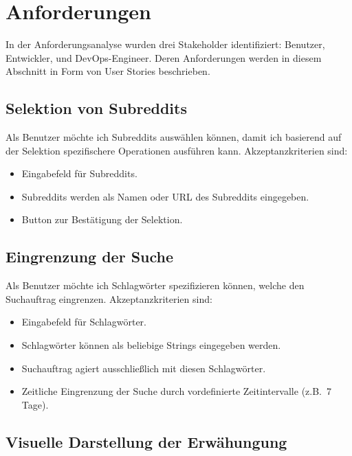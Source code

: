 \documentclass[a4paper, 10pt, conference]{ieeeconf}
\begin{document}
\section{Anforderungen} \label{s:anforderungen}

In der Anforderungsanalyse wurden drei Stakeholder identifiziert: Benutzer, Entwickler, und DevOps-Engineer. Deren Anforderungen werden in diesem Abschnitt in Form von User Stories beschrieben.

\subsection{Selektion von Subreddits}

Als Benutzer möchte ich Subreddits auswählen können, damit ich basierend auf der Selektion spezifischere Operationen ausführen kann. Akzeptanzkriterien sind:
\begin{itemize}
\item Eingabefeld für Subreddits.
\item Subreddits werden als Namen oder URL des Subreddits eingegeben.
\item Button zur Bestätigung der Selektion.
\end{itemize}

\subsection{Eingrenzung der Suche}

Als Benutzer möchte ich Schlagwörter spezifizieren können, welche den Suchauftrag eingrenzen. Akzeptanzkriterien sind:
\begin{itemize}
\item Eingabefeld für Schlagwörter.
\item Schlagwörter können als beliebige Strings eingegeben werden.
\item Suchauftrag agiert ausschließlich mit diesen Schlagwörter.
\item Zeitliche Eingrenzung der Suche durch vordefinierte Zeitintervalle (z.B.~7 Tage).
\end{itemize}

\subsection{Visuelle Darstellung der Erwähungung}
\end{document}

